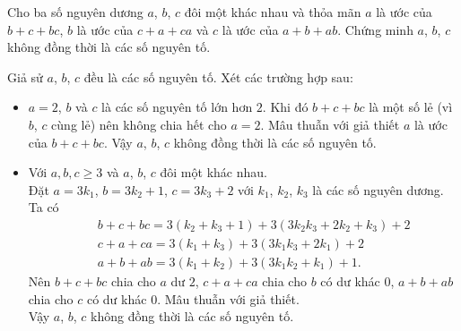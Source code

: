 \begin{ex}%
	Cho ba số nguyên dương $a$, $b$, $c$ đôi một khác nhau và thỏa mãn $a$ là ước của $b+c+bc$, $b$ là ước của $c+a+ca$ và $c$ là ước của $a+b+ab$. Chứng minh $a$, $b$, $c$ không đồng thời là các số nguyên tố.
	\loigiai
	{
	 Giả sử $a$, $b$, $c$ đều là các số nguyên tố. Xét các trường hợp sau:
	 \begin{itemize}
	  \item $a=2$, $b$ và $c$ là các số nguyên tố lớn hơn $2$. Khi đó $b+c+bc$ là một số lẻ (vì $b$, $c$ cùng lẻ) nên không chia hết cho $a=2$. Mâu thuẫn với giả thiết $a$ là ước của $b+c+bc$. Vậy $a$, $b$, $c$ không đồng thời là các số nguyên tố.
	  \item Với $a,b,c \geq 3$  và $a$, $b$, $c$ đôi một khác nhau.\\
	  Đặt $a=3k_1$, $b=3k_2+1$, $c=3k_3+2$ với $k_1$, $k_2$, $k_3$ là các số nguyên dương.\\
	  Ta có
	  \begin{eqnarray*}
	   && b+c+bc=3(k_2+k_3+1)+3(3k_2k_3+2k_2+k_3)+2\\
	   && c+a+ca=3(k_1+k_3)+3(3k_1k_3+2k_1)+2\\
	   && a+b+ab=3(k_1+k_2)+3(3k_1k_2+k_1)+1.
	  \end{eqnarray*}
	  Nên $b+c+bc$ chia cho $a$ dư $2$, $c+a+ca$ chia cho $b$ có dư khác $0$, $a+b+ab$ chia cho $c$ có dư khác $0$. Mâu thuẫn với giả thiết.\\
	  Vậy $a$, $b$, $c$ không đồng thời là các số nguyên tố.
	 \end{itemize}
	}
\end{ex}



